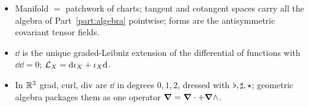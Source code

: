 \begin{keypoints}[Part II]
\begin{itemize}
\item Manifold $=$ patchwork of charts; tangent and cotangent spaces carry all the algebra of Part~\ref{part:algebra} pointwise; forms are the antisymmetric covariant tensor fields.
\item $\dd$ is the unique graded-Leibniz extension of the differential of functions with $\dd\dd=0$; $\mathcal{L}_X=\mathrm{d}\iota_X+\iota_X\mathrm{d}$.
\item In $\mathbb{R}^3$ grad, curl, div are $\dd$ in degrees $0,1,2$, dressed with $\flat,\sharp,\star$; geometric algebra packages them as one operator $\boldsymbol{\nabla}=\boldsymbol{\nabla}\cdot+\boldsymbol{\nabla}\wedge$.
\end{itemize}
\end{keypoints}

